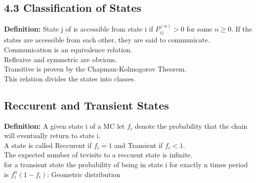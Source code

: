 \documentclass{article}
\begin{document}
\subsection*{4.3 Classification of States}
\textbf{Definition:} State j of is accessible from state i if $P_{ij}^{(n)} > 0$ for some $n \geq 0$. If the states are accessible from each other, they are said to communicate.\\
Communication is an equivalence relation.\\
Reflexive and symmetric are obvious.\\
Transitive is proven by the Chapman-Kolmogorov Theorem.\\
This relation divides the states into classes.\\
\subsection*{Reccurent and Transient States}
\textbf{Definition:} A given state i of a MC let $f_i$ denote the probability that the chain will eventually return to state i.\\
A state is called Reccurent if $f_i = 1$ and Transient if $f_i < 1$.\\
The expected number of tevisits to a reccuent state is infinite.\\
for a transient state the probability of being in state i for exactly n times period is $f_i^n (1-f_i)$: Geometric distribution\\
\end{document}
